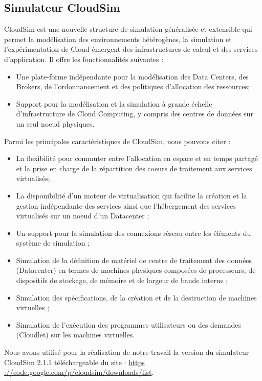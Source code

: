 \subsection{Simulateur CloudSim}
\begin{onehalfspace}
CloudSim est une nouvelle structure de simulation généralisée et extensible qui permet
la modélisation des environnements hétérogènes, la simulation et l’expérimentation de
Cloud émergent des infrastructures de calcul et des services d’application. Il offre les
fonctionnalités suivantes :\medskip
\begin{itemize}
\item Une plate-forme indépendante pour la modélisation des Data Centers, des Brokers, de l'ordonnancement et des politiques d'allocation des ressources;
\item Support pour la modélisation et la simulation à grande échelle d’infrastructure de
Cloud Computing, y compris des centres de données sur un seul noeud physiques.
\end{itemize}\medskip

Parmi les principales caractéristiques de CloudSim, nous pouvons citer :
\begin{itemize}
\item La flexibilité pour commuter entre l’allocation en espace et en temps
partagé 
et la prise en charge de la répartition des coeurs de traitement aux services
virtualisés;
\item La disponibilité d’un moteur de virtualisation qui facilite la création et la gestion
indépendante des services ainsi que l’hébergement des services virtualisés sur un
noeud d’un Datacenter ;
\item Un support pour la simulation des connexions réseau entre les éléments du système
de simulation ;
\item Simulation de la définition de matériel de centre de traitement des données (Datacenter)
en termes de machines physiques composées de processeurs, de dispositifs
de stockage, de mémoire et de largeur de bande interne ;
\item Simulation des spécifications, de la création et de la destruction de machines virtuelles
;
\item Simulation de l’exécution des programmes utilisateurs ou des demandes (Cloudlet)
sur les machines virtuelles.

\end{itemize}
Nous avons utilisé pour la réalisation de notre travail la version du simulateur CloudSim 2.1.1 téléchargeable du site : \url{https ://code.google.com/p/cloudsim/downloads/list}.
\end{onehalfspace}
